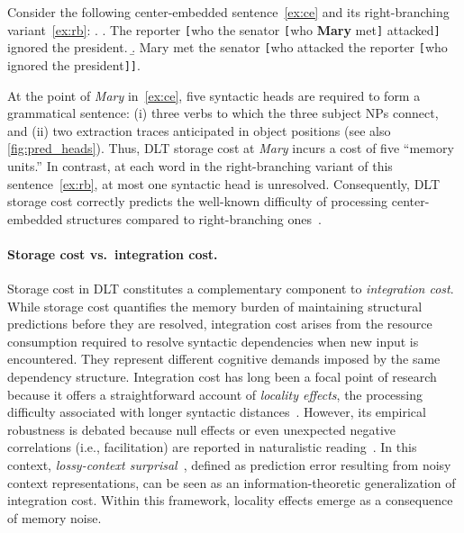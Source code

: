 \documentclass[11pt]{article}
\begin{document}
Consider the following center-embedded sentence~\ref{ex:ce} and its right-branching variant~\ref{ex:rb}:%
\ex.\label{ex:cerb}
    \a. The reporter \texttt{[}who the senator \texttt{[}who \textcolor{cudOrange}{\textbf{Mary}} met\texttt{]} attacked\texttt{]} ignored the president.\label{ex:ce}
    \b. Mary met the senator \texttt{[}who attacked the reporter \texttt{[}who ignored the president\texttt{]}\texttt{]}.\label{ex:rb}

At the point of \textcolor{cudOrange}{\textit{Mary}} in~\ref{ex:ce}, five syntactic heads are required to form a grammatical sentence: (i) three verbs to which the three subject NPs connect, and (ii) two extraction traces anticipated in object positions (see also \cref{fig:pred_heads}).
Thus, DLT storage cost at \textcolor{cudOrange}{\textit{Mary}} incurs a cost of five ``memory units.''
In contrast, at each word in the right-branching variant of this sentence~\ref{ex:rb}, at most one syntactic head is unresolved.
Consequently, DLT storage cost correctly predicts the well-known difficulty of processing center-embedded structures compared to right-branching ones~\citep{yngve-1960,miller-chomsky-1963,gibson-1998}.

\paragraph{Storage cost vs.\ integration cost.}
Storage cost in DLT constitutes a complementary component to \emph{integration cost}.
While storage cost quantifies the memory burden of maintaining structural predictions before they are resolved, integration cost arises from the resource consumption required to resolve syntactic dependencies when new input is encountered.
They represent different cognitive demands imposed by the same dependency structure.
Integration cost has long been a focal point of research~\citep[e.g.,][]{gibson-2000,futrell-etal-2020-dependency} because it offers a straightforward account of \emph{locality effects}, the processing difficulty associated with longer syntactic distances~\citep{gibson-2000,grodner-gibson-2005,staub-2010,bartek-etal-2011,roland-etal-2021}.
However, its empirical robustness is debated because null effects or even unexpected negative correlations (i.e., facilitation) are reported in naturalistic reading~\citep{demberg-keller-2008,shain-schuler-2018,dotlacil-2021,isono-2024}.
In this context, \emph{lossy-context surprisal}~\citep{futrell-etal-2020-lossy}, defined as prediction error resulting from noisy context representations, can be seen as an information-theoretic generalization of integration cost. 
Within this framework, locality effects emerge as a consequence of memory noise.
\end{document}
